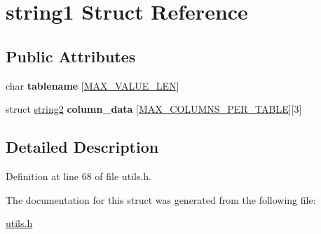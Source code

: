 \hypertarget{structstring1}{\section{string1 Struct Reference}
\label{structstring1}
}
\subsection*{Public Attributes}
\begin{DoxyCompactItemize}
\item 
\hypertarget{structstring1_af861d0329a87e3077359f888273185ee}{char {\bfseries tablename} \mbox{[}\hyperlink{storage_8h_a00a29850f2b5b985f776f864d83e5ac3}{M\-A\-X\-\_\-\-V\-A\-L\-U\-E\-\_\-\-L\-E\-N}\mbox{]}}\label{structstring1_af861d0329a87e3077359f888273185ee}

\item 
\hypertarget{structstring1_a4fc5a02ccac8b5215d2b9587701262b6}{struct \hyperlink{structstring2}{string2} {\bfseries column\-\_\-data} \mbox{[}\hyperlink{storage_8h_a2c806bc7de304d1d07bb12c9d58dbdd1}{M\-A\-X\-\_\-\-C\-O\-L\-U\-M\-N\-S\-\_\-\-P\-E\-R\-\_\-\-T\-A\-B\-L\-E}\mbox{]}\mbox{[}3\mbox{]}}\label{structstring1_a4fc5a02ccac8b5215d2b9587701262b6}

\end{DoxyCompactItemize}


\subsection{Detailed Description}


Definition at line 68 of file utils.\-h.



The documentation for this struct was generated from the following file\-:\begin{DoxyCompactItemize}
\item 
\hyperlink{utils_8h}{utils.\-h}\end{DoxyCompactItemize}
